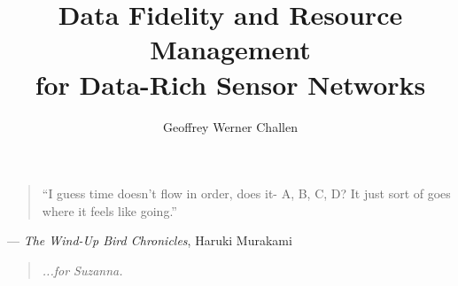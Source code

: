 
\title{Data Fidelity and Resource Management\\for Data-Rich Sensor Networks}
\author{Geoffrey Werner Challen}

\maketitle
\copyrightpage


\begin{abstract}

\end{abstract}


{\ssp
\epigram
\vspace*{50pt}
\begin{quote} 
\hspace{0.25in}``I guess time doesn't flow in order, does it- A, B, C, D? It just sort of goes
where it feels like going.''
\end{quote}
\hfill--- \textit{The Wind-Up Bird Chronicles}, Haruki Murakami}
\newpage


{\ssp
{}
{}
\tableofcontents
\newpage
\listoffigures
\listoftables}


\begin{acknowledgments}

\end{acknowledgments}


{\ssp
\dedication
\vspace*{50pt}
\begin{quote}
\hfill \textit{...for Suzanna.}
\end{quote}}
\newpage


\startarabicpagination
